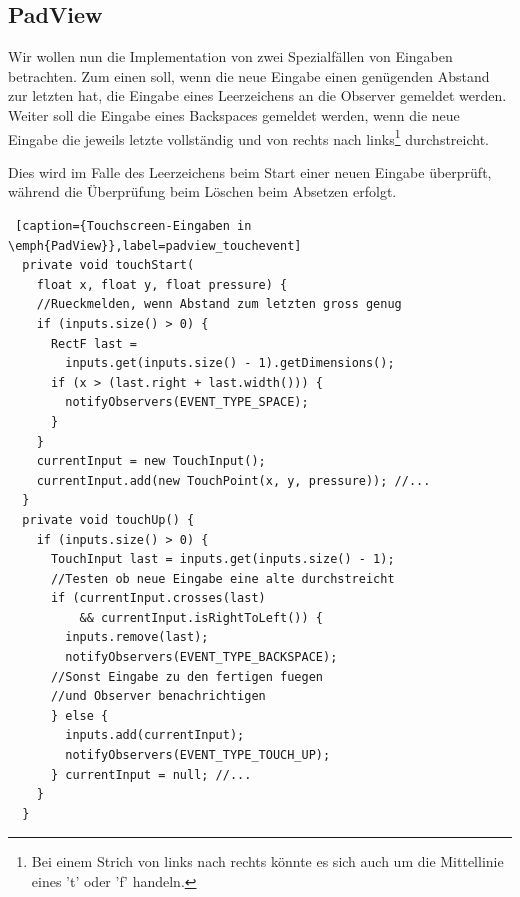 \subsection{PadView}

Wir wollen nun die Implementation von zwei Spezialfällen von Eingaben betrachten. Zum einen soll, wenn die neue Eingabe einen genügenden Abstand zur letzten hat, die Eingabe eines Leerzeichens an die Observer gemeldet werden. Weiter soll die Eingabe eines Backspaces gemeldet werden, wenn die neue Eingabe die jeweils letzte vollständig und von rechts nach links\footnote{Bei einem Strich von links nach rechts könnte es sich auch um die Mittellinie eines 't' oder 'f' handeln.} durchstreicht.

Dies wird im Falle des Leerzeichens beim Start einer neuen Eingabe überprüft, während die Überprüfung beim Löschen beim Absetzen erfolgt.

\begin{lstlisting} [caption={Touchscreen-Eingaben in \emph{PadView}},label=padview_touchevent]
  private void touchStart(
    float x, float y, float pressure) {
    //Rueckmelden, wenn Abstand zum letzten gross genug
    if (inputs.size() > 0) {
      RectF last = 
        inputs.get(inputs.size() - 1).getDimensions();
      if (x > (last.right + last.width())) {
        notifyObservers(EVENT_TYPE_SPACE);
      }
    }
    currentInput = new TouchInput();
    currentInput.add(new TouchPoint(x, y, pressure)); //...
  }
  private void touchUp() {
    if (inputs.size() > 0) {
      TouchInput last = inputs.get(inputs.size() - 1);
      //Testen ob neue Eingabe eine alte durchstreicht
      if (currentInput.crosses(last) 
          && currentInput.isRightToLeft()) {
        inputs.remove(last);
        notifyObservers(EVENT_TYPE_BACKSPACE);
      //Sonst Eingabe zu den fertigen fuegen 
      //und Observer benachrichtigen
      } else {
        inputs.add(currentInput);
        notifyObservers(EVENT_TYPE_TOUCH_UP);
      } currentInput = null; //...
    }
  }
\end{lstlisting}


